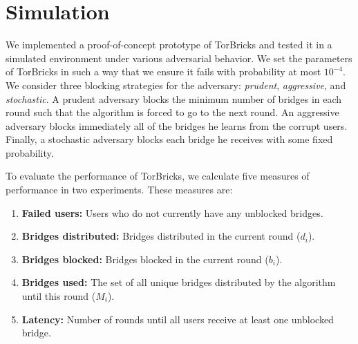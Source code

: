 \documentclass[a4paper,UKenglish]{lipics-v2016}
\newcommand{\bricks}{}
\def\bricks/{\mbox{TorBricks}}
\newcommand{\sfsize}{\fontsize{0.68\baselineskip}{0.68\baselineskip}\selectfont}
\newcommand{\sans}[1]{\textbf{\textsf{\sfsize \mbox{#1}}}}
\begin{document}
\section{Simulation} \label{sec:simulations}
We implemented a proof-of-concept prototype of \bricks/ and tested it in a simulated environment under various adversarial behavior. %
We set the parameters of \bricks/ in such a way that we ensure it fails with probability at most $10^{-4}$. 
We consider three blocking strategies for the adversary: \emph{prudent}, \emph{aggressive}, and \emph{stochastic}. A prudent adversary blocks the minimum number of bridges in each round such that the algorithm is forced to go to the next round. An aggressive adversary blocks immediately all of the bridges he learns from the corrupt users. Finally, a stochastic adversary blocks each bridge he receives with some fixed probability.

To evaluate the performance of \bricks/, we calculate five measures of performance in two experiments. These measures are:

\begin{enumerate}[itemsep=0.4em, topsep=0.55em]
	\item \textbf{Failed users:} Users who do not currently have any unblocked bridges. \label{measure:thirsty}
	\item \textbf{Bridges distributed:} Bridges distributed in the current round ($d_i$). \label{measure:d_i}
	\item \textbf{Bridges blocked:} Bridges blocked in the current round ($b_i$). \label{measure:b_i}
	\item \textbf{Bridges used:} The set of all unique bridges distributed by the algorithm until this round ($M_i$). \label{measure:M_i}
	\item \textbf{Latency:} Number of rounds until all users receive at least one unblocked bridge. \label{measure:latency}
\end{enumerate}
\end{document}
